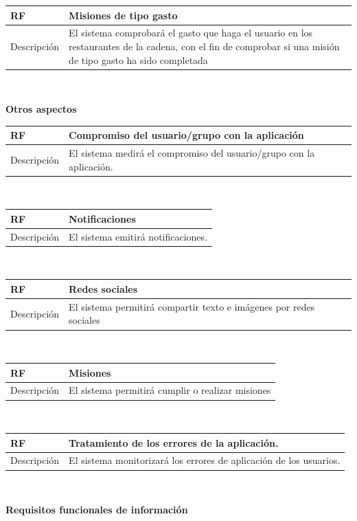 \documentclass[twoside]{report}
\newcommand\addrow[2]{#1 &#2\\ }
\newcommand\addheading[2]{#1 &#2\\ \hline}
\newcommand\tabularhead{\begin{tabular}{lp{0.7\textwidth}}
\hline
}
\newenvironment{req}{\tabularhead}
{\hline\end{tabular}}
\begin{document}
\begin{req}
	\addheading{\textbf{RF\arabic{functionalRequirements}}}{Misiones de tipo gasto}
	\addrow{Descripción}{El sistema comprobará el gasto que haga el usuario en los restaurantes de la cadena, con el fin de comprobar si una misión de tipo gasto ha sido completada}
\end{req}\\

\textbf{Otros aspectos}\\

\begin{req}
	\label{rfcompromiso}
	\addheading{\textbf{RF\arabic{functionalRequirements}}}{Compromiso del usuario/grupo con la aplicación}
	\addrow{Descripción}{El sistema medirá el compromiso del usuario/grupo con la aplicación.}
\end{req}\\

\begin{req}
	\addheading{\textbf{RF\arabic{functionalRequirements}}}{Notificaciones}
	\addrow{Descripción}{El sistema emitirá notificaciones.}
\end{req}\\

\begin{req}
	\addheading{\textbf{RF\arabic{functionalRequirements}}}{Redes sociales}
	\addrow{Descripción}{El sistema permitirá compartir texto e imágenes por redes sociales}
\end{req}\\

\begin{req}
	\addheading{\textbf{RF\arabic{functionalRequirements}}}{Misiones}
	\addrow{Descripción}{El sistema permitirá cumplir o realizar misiones}
\end{req}\\

\begin{req}
	\addheading{\textbf{RF\arabic{functionalRequirements}}}{Tratamiento de los errores de la aplicación.}
	\addrow{Descripción}{El sistema monitorizará los errores de aplicación de los usuarios.}
\end{req}\\

\textbf{Requisitos funcionales de información}\\
\end{document}
